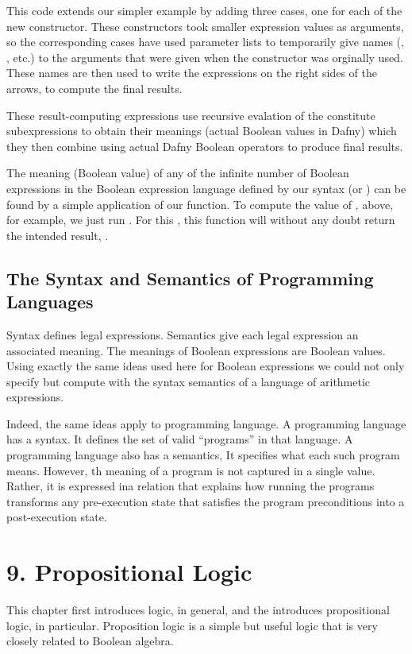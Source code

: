 \documentclass[letterpaper,10pt,english]{sphinxmanual}
\begin{document}
This code extends our simpler example by adding three cases, one for
each of the new constructor. These constructors took smaller
expression values as arguments, so the corresponding cases have used
parameter lists to temporarily give names (, , etc.) to the
arguments that were given when the constructor was orginally used.
These names are then used to write the expressions on the right sides
of the arrows, to compute the final results.

These result-computing expressions use recursive evalation of the
constitute subexpressions to obtain their meanings (actual Boolean
values in Dafny) which they then combine using actual Dafny Boolean
operators to produce final results.

The meaning (Boolean value) of any of the infinite number of Boolean
expressions in the Boolean expression language defined by our syntax
(or ) can be found by a simple application of our 
function. To compute the value of , above, for example, we just run
. For this , this function will without any doubt return
the intended result, .


\section{The Syntax and Semantics of Programming Languages}
\label{\detokenize{08-boolean-algebra:the-syntax-and-semantics-of-programming-languages}}
Syntax defines legal expressions. Semantics give each legal expression
an associated meaning. The meanings of Boolean expressions are Boolean
values. Using exactly the same ideas used here for Boolean expressions
we could not only specify but compute with the syntax semantics of a
language of arithmetic expressions.

Indeed, the same ideas apply to programming language. A programming
language has a syntax. It defines the set of valid “programs” in that
language. A programming language also has a semantics, It specifies
what each such program means. However, th meaning of a program is not
captured in a single value. Rather, it is expressed ina relation that
explains how running the programs transforms any pre-execution state
that satisfies the program preconditions into a post-execution state.


\chapter{9. Propositional Logic}
\label{\detokenize{09-propositional-logic:propositional-logic}}\label{\detokenize{09-propositional-logic::doc}}
This chapter first introduces logic, in general, and the introduces
propositional logic, in particular. Proposition logic is a simple but
useful logic that is very closely related to Boolean algebra.
\end{document}
